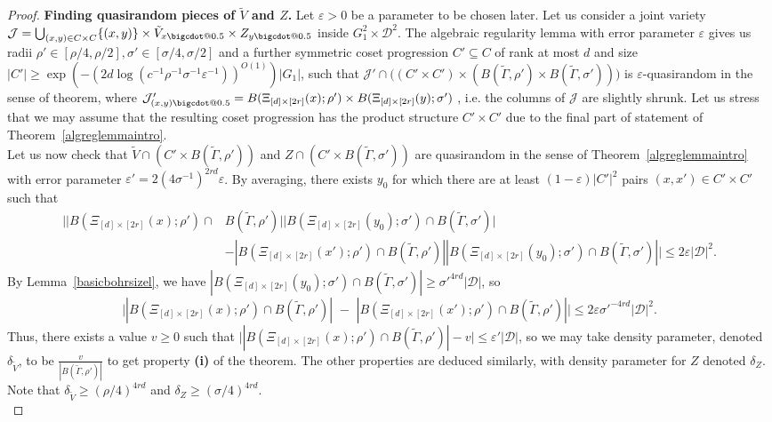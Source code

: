 \documentclass[a4paper,11pt]{article}
\makeatletter
\numberwithin{theorem}{section}
\theoremstyle{definition}
\newcommand*\bcdot{\mathpalette\bigcdot@{0.5}}
\newcommand*\bigcdot@[2]{\mathbin{\vcenter{\hbox{\scalebox{#2}{$\m@th#1\bullet$}}}}}
\makeatother
\begin{document}
\begin{proof}
    \noindent\textbf{Finding quasirandom pieces of $\tilde{V}$ and $Z$.} Let $\varepsilon > 0$ be a parameter to be chosen later. Let us consider a joint variety $\mathcal{J} = \bigcup_{(x, y) \in C \times C} \{(x, y)\} \times \tilde{V}_{x \bcdot} \times Z_{y \bcdot}$ inside $G^2_1 \times \mathcal{D}^2$. The algebraic regularity lemma with error parameter $\varepsilon$ gives us radii $\rho' \in [\rho/4, \rho/2], \sigma' \in [\sigma/4, \sigma/2]$ and a further symmetric coset progression $C' \subseteq C$ of rank at most $d$ and size $|C'| \geq \exp(-(2d\log(c^{-1} \rho^{-1}\sigma^{-1} \varepsilon^{-1}))^{O(1)}) |G_1|$, such that $\mathcal{J}' \cap \Big((C' \times C') \times (B(\tilde{\Gamma}, \rho') \times B(\tilde{\Gamma}, \sigma'))\Big)$ is $\varepsilon$-quasirandom in the sense of theorem, where $\mathcal{J}'_{(x,y) \bcdot} = B(\Xi_{[d] \times [2r]}(x); \rho') \times B(\Xi_{[d] \times [2r]}(y); \sigma')$ , i.e. the columns of $\mathcal{J}$ are slightly shrunk. Let us stress that we may assume that the resulting coset progression has the product structure $C' \times C'$ due to the final part of statement of Theorem~\ref{algreglemmaintro}.\\
    
    Let us now check that $\tilde{V} \cap (C' \times B(\tilde{\Gamma}, \rho'))$ and $Z \cap (C' \times B(\tilde{\Gamma}, \sigma'))$ are quasirandom in the sense of Theorem~\ref{algreglemmaintro} with error parameter $\varepsilon' = 2(4\sigma^{-1})^{2rd} \varepsilon$. By averaging, there exists $y_0$ for which there are at least $(1-\varepsilon) |C'|^2$ pairs $(x, x') \in C' \times C'$ such that 
    \begin{align*}\Big||B(\Xi_{[d] \times [2r]}(x); \rho') \cap &B(\tilde{\Gamma}, \rho')| |B(\Xi_{[d] \times [2r]}(y_0); \sigma') \cap B(\tilde{\Gamma}, \sigma')| \\
    &- |B(\Xi_{[d] \times [2r]}(x'); \rho') \cap B(\tilde{\Gamma}, \rho')| |B(\Xi_{[d] \times [2r]}(y_0); \sigma') \cap B(\tilde{\Gamma}, \sigma')|\Big| \leq 2\varepsilon |\mathcal{D}|^2.\end{align*}
    By Lemma~\ref{basicbohrsizel}, we have $|B(\Xi_{[d] \times [2r]}(y_0); \sigma') \cap B(\tilde{\Gamma}, \sigma')| \geq {\sigma'}^{4rd} |\mathcal{D}|$, so
    \[\Big||B(\Xi_{[d] \times [2r]}(x); \rho') \cap B(\tilde{\Gamma}, \rho')|  \,\,- \,\,|B(\Xi_{[d] \times [2r]}(x'); \rho') \cap B(\tilde{\Gamma}, \rho')| \Big| \leq 2\varepsilon{\sigma'}^{-4rd}  |\mathcal{D}|^2.\] 
    Thus, there exists a value $v \geq 0$ such that $\Big||B(\Xi_{[d] \times [2r]}(x); \rho') \cap B(\tilde{\Gamma}, \rho')|   - v\Big| \leq \varepsilon' |\mathcal{D}|$, so we may take density parameter, denoted $\delta_{\tilde{V}}$, to be $\frac{v}{|B(\tilde{\Gamma}, \rho')|}$ to get property \textbf{(i)} of the theorem. The other properties are deduced similarly, with density parameter for $Z$ denoted $\delta_Z$. Note that $\delta_{\tilde{V}} \geq (\rho/4)^{4rd}$ and $\delta_Z \geq (\sigma/4)^{4rd}$.\\
    

\end{proof}
\end{document}
